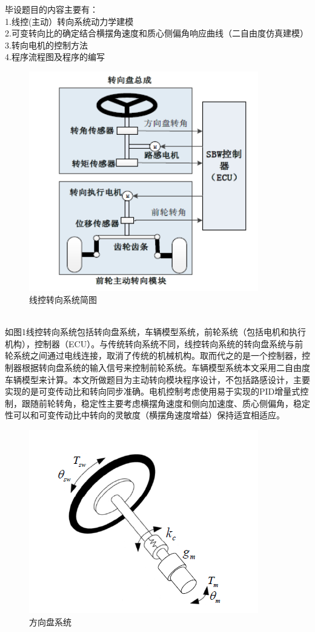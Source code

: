 \documentclass[a4paper,12pt,UTF8]{ctexart}
\begin{document}
 毕设题目的内容主要有：\\
\indent 1.线控(主动）转向系统动力学建模\\
\indent 2.可变转向比的确定结合横摆角速度和质心侧偏角响应曲线（二自由度仿真建模）\\
\indent 3.转向电机的控制方法\\
\indent 4.程序流程图及程序的编写\\
\begin{figure}[htbp]
  \centering
  \includegraphics[width=10cm]{1.png}
  \caption{线控转向系统简图}
\end{figure}\\
\indent 如图1线控转向系统包括转向盘系统，车辆模型系统，前轮系统（包括电机和执行机构），控制器（ECU）。与传统转向系统不同，线控转向系统的转向盘系统与前轮系统之间通过电线连接，取消了传统的机械机构。取而代之的是一个控制器，控制器根据转向盘系统的输入信号来控制前轮系统。车辆模型系统本文采用二自由度车辆模型来计算。本文所做题目为主动转向模块程序设计，不包括路感设计，主要实现的是可变传动比和转向同步准确。电机控制考虑使用易于实现的PID增量式控制，跟随前轮转角，稳定性主要考虑横摆角速度和侧向加速度、质心侧偏角，稳定性可以和可变传动比中转向的灵敏度（横摆角速度增益）保持适宜相适应。\\
\begin{figure}[htbp]
  \centering
  \includegraphics[width=10cm]{2.png}
  \caption{方向盘系统}
\end{figure}\\
\end{document}
